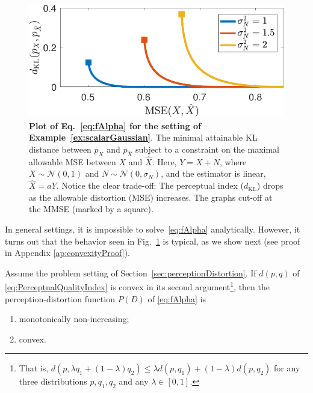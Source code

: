 \begin{figure}
	\begin{center}
        \includegraphics[width=0.9\linewidth]{figures/scalarGaussian.pdf}
	\end{center}
	\caption{\textbf{Plot of Eq.~\eqref{eq:fAlpha} for the setting of Example~\ref{ex:scalarGaussian}}. The minimal attainable KL distance between $p_X$ and $p_{\hat{X}}$ subject to a constraint on the maximal allowable MSE between $X$ and $\hat{X}$. Here, $Y=X+N$, where $X \sim \mathcal{N}(0,1)$ and $N \sim \mathcal{N}(0,\sigma_N)$, and the estimator is linear, $\hat{X}=aY$. Notice the clear trade-off: The perceptual index ($d_{\text{KL}}$) drops as the allowable distortion (MSE) increases. The graphs cut-off at the MMSE (marked by a square).}
	\label{fig:scalarGaussianExample}
\end{figure}

In general settings, it is impossible to solve~\eqref{eq:fAlpha} analytically. However, it turns out that the behavior seen in Fig.~\ref{fig:scalarGaussianExample} is typical, as we show next (see proof in Appendix \ref{ap:convexityProof}).


\begin{theorem}\label{lem:convexity}
Assume the problem setting of Section~\ref{sec:perceptionDistortion}. If $d(p,q)$ of \eqref{eq:PerceptualQualityIndex} is convex in its second argument\footnote{That is, $d(p,\lambda q_1 + (1-\lambda) q_2) \le \lambda d(p,q_1) + (1-\lambda) d(p,q_2)$ for any three distributions $p,q_1,q_2$ and any $\lambda \in [0,1]$.},
then the perception-distortion function $P(D)$ of \eqref{eq:fAlpha} is
\vspace{-0.15cm}
\begin{enumerate}
	\item monotonically non-increasing;
	\item convex.
\end{enumerate}
\end{theorem}

